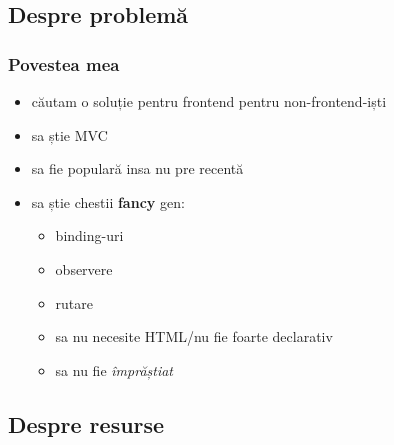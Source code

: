 \documentclass[compress]{beamer}
\begin{document}
\subsection{Despre problemă}

\begin{frame}
\frametitle{Povestea mea}

\hypertarget{why}{}

\begin{itemize}[<+->]
  \item căutam o soluție pentru frontend pentru non-frontend-iști
  \item sa știe MVC
  \item sa fie populară insa nu pre recentă
  \item sa știe chestii \textbf{fancy} gen:
    \begin{itemize}[<+->]
      \item binding-uri
      \item observere
      \item rutare
      \item sa nu necesite HTML/nu fie foarte declarativ
      \item sa nu fie \em împrăștiat
    \end{itemize}
\end{itemize}
\end{frame}

\subsection{Despre resurse}
\end{document}
